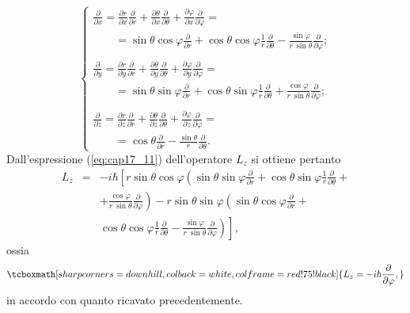 \begin{equation}
\begin{cases}
\displaystyle{\frac{\partial}{\partial x} = \frac{\partial r}{\partial x}\frac{\partial}{\partial r}+\frac{\partial \theta}{\partial x}\frac{\partial}{\partial \theta}+ \frac{\partial \varphi}{\partial x}\frac{\partial}{\partial \varphi} = }\\
\qquad = \displaystyle{\sin\theta \cos \varphi \frac{\partial}{\partial r}+\cos\theta \cos \varphi\frac{1}{r} \frac{\partial}{\partial \theta}-\frac{\sin \varphi}{r\ \sin \theta} \frac{\partial}{\partial \varphi}}; \\
\\
\displaystyle{\frac{\partial}{\partial y} = \frac{\partial r}{\partial y}\frac{\partial}{\partial r}+\frac{\partial \theta}{\partial y}\frac{\partial}{\partial \theta}+ \frac{\partial \varphi}{\partial y}\frac{\partial}{\partial \varphi} = }\\
\qquad = \displaystyle{\sin\theta \sin \varphi \frac{\partial}{\partial r}+\cos\theta \sin \varphi\frac{1}{r} \frac{\partial}{\partial \theta}+\frac{\cos \varphi}{r\ \sin \theta} \frac{\partial}{\partial \varphi}}; \\
\\
\displaystyle{\frac{\partial}{\partial z} = \frac{\partial r}{\partial z}\frac{\partial}{\partial r}+\frac{\partial \theta}{\partial z}\frac{\partial}{\partial \theta}+ \frac{\partial \varphi}{\partial z}\frac{\partial}{\partial \varphi} = }\\
\qquad = \displaystyle{\cos\theta\frac{\partial}{\partial r}-\frac{\sin \theta}{r} \frac{\partial}{\partial \theta}}.
\end{cases}
\end{equation}
Dall'espressione (\ref{eq:cap17_11}) dell'operatore $L_z$ si ottiene pertanto
\begin{eqnarray}
L_z &=&-i\hbar \left[ r\sin \theta \cos \varphi \left(\sin \theta \sin \varphi \frac{\partial}{\partial r}+\cos \theta \sin \varphi\frac{1}{r} \frac{\partial}{\partial \theta}+ \right.\right. \nonumber \\
& &\left. + \frac{\cos \varphi}{r\ \sin \theta} \frac{\partial}{\partial \varphi}\right) - r \sin \theta \sin \varphi \left( \sin \theta \cos \varphi \frac{\partial}{\partial r}+\right. \nonumber \\
& & \left. \left. \cos \theta \cos \varphi\frac{1}{r} \frac{\partial}{\partial \theta}-\frac{\sin \varphi}{r\ \sin \theta} \frac{\partial}{\partial \varphi}\right)\right] ,
\end{eqnarray}
ossia
	\begin{equation}
		\tcboxmath[sharp corners=downhill, colback=white, colframe=red!75!black]{
		L_z = -i\hbar \frac{\partial}{\partial \varphi},
		}
	\end{equation}
in accordo con quanto ricavato precedentemente.\\

